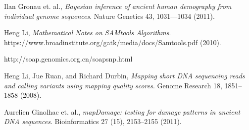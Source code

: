 \documentclass{article}
\begin{document}
\begin{thebibliography}{9}

  Ilan Gronau et. al.,
  \emph{Bayesian inference of ancient human demography from individual genome sequences}.
  Nature Genetics 43, 1031---1034 (2011).

  Heng Li,
  \emph{Mathematical Notes on SAMtools Algorithms}.
  https://www.broadinstitute.org/gatk/media/docs/Samtools.pdf (2010).

  http://soap.genomics.org.cn/soapsnp.html

  Heng Li, Jue Ruan, and Richard Durbin,
  \emph{Mapping short DNA sequencing reads and calling variants using mapping quality scores}.
  Genome Research 18, 1851--1858 (2008). 

  Aurelien Ginolhac et. al.,
  \emph{mapDamage: testing for damage patterns in ancient DNA sequences}.
  Bioinformatics 27 (15), 2153--2155 (2011).

\end{thebibliography}
\end{document}

